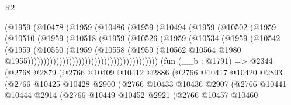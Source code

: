 \begin{lexlean}{R2}
\begin{coremodule}
                                      (@1959
                                        (@10478
                                          (@1959
                                            (@10486
                                              (@1959
                                                (@10494
                                                  (@1959
                                                    (@10502
                                                      (@1959
                                                        (@10510
                                                          (@1959
                                                            (@10518
                                                              (@1959
                                                                (@10526
                                                                  (@1959
                                                                    (@10534
                                                                      (@1959
                                                                        (@10542
                                                                          (@1959
                                                                            (@10550
                                                                              (@1959
                                                                                (@10558
                                                                                  (@1959
                                                                                    (@10562
                                                                                      @10564
                                                                                      @1980
                                                                                      @1955)))))))))))))))))))))))))))))))))))))))))
    (fun (__b : @1791) =>
    @2344
      (@2768
        @2879
        (@2766
          @10409
          @10412
          @2886
          (@2766
            @10417
            @10420
            @2893
            (@2766
              @10425
              @10428
              @2900
              (@2766
                @10433
                @10436
                @2907
                (@2766
                  @10441
                  @10444
                  @2914
                  (@2766
                    @10449
                    @10452
                    @2921
                    (@2766
                      @10457
                      @10460

\end{coremodule}
\end{lexlean}
